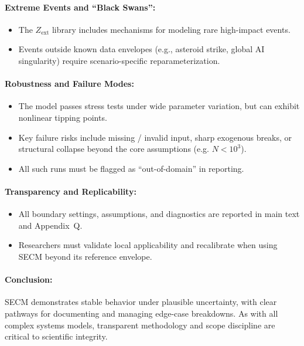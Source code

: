 \documentclass[12pt]{report}
\begin{document}
\paragraph{Extreme Events and ``Black Swans'':}
\begin{itemize}
  \item The $Z_{\text{ext}}$ library includes mechanisms for modeling rare high-impact events.
  \item Events outside known data envelopes (e.g., asteroid strike, global AI singularity) require scenario-specific reparameterization.
\end{itemize}

\paragraph{Robustness and Failure Modes:}
\begin{itemize}
  \item The model passes stress tests under wide parameter variation, but can exhibit nonlinear tipping points.
  \item Key failure risks include missing / invalid input, sharp exogenous breaks, or structural collapse beyond the core assumptions (e.g. $N < 10^3$).
  \item All such runs must be flagged as ``out-of-domain'' in reporting.
\end{itemize}

\paragraph{Transparency and Replicability:}
\begin{itemize}
  \item All boundary settings, assumptions, and diagnostics are reported in main text and Appendix~Q.
  \item Researchers must validate local applicability and recalibrate when using SECM beyond its reference envelope.
\end{itemize}

\paragraph{Conclusion:}
SECM demonstrates stable behavior under plausible uncertainty, with clear pathways for documenting and managing edge-case breakdowns. As with all complex systems models, transparent methodology and scope discipline are critical to scientific integrity.
\end{document}
